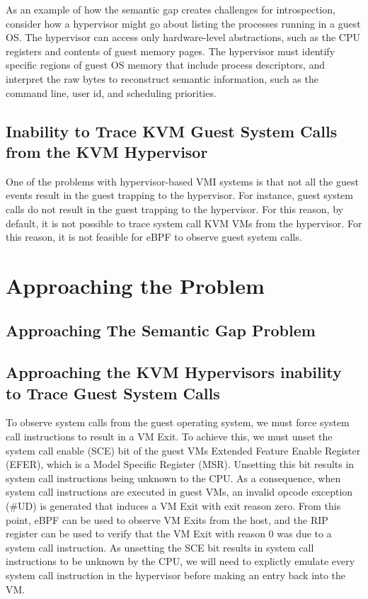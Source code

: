 \documentclass{report}
\begin{document}
\begin{spacing}{1.5}
{As an example of how the semantic gap creates challenges for introspection, consider how a hypervisor might
go about listing the processes running in a guest OS. The hypervisor can access only hardware-level abstractions, such
as the CPU registers and contents of guest memory pages. The hypervisor must identify specific regions of guest OS memory that include process descriptors, and interpret the raw bytes to reconstruct semantic information, such as the
command line, user id, and scheduling priorities.
\newline
}


\subsection{Inability to Trace KVM Guest System Calls from the KVM Hypervisor}

{\large
One of the problems with hypervisor-based VMI systems is that not all the guest events result in the guest trapping to the hypervisor. For instance, guest system calls do not result in the guest trapping to the hypervisor. For this reason, by default, it is not possible to trace system call KVM VMs from the hypervisor. For this reason, it is not feasible for eBPF to observe guest system calls.
\newline
}







\section{Approaching the Problem}


\subsection{Approaching The Semantic Gap Problem}



\subsection{Approaching the KVM Hypervisors inability to Trace Guest System Calls}

{\large
To observe system calls from the guest operating system, we must force system call instructions to result in a VM Exit. To achieve this, we must unset the system call enable (SCE) bit of the guest VMs Extended Feature Enable Register (EFER), which is a Model Specific Register (MSR). Unsetting this bit results in system call instructions being unknown to the CPU. As a consequence, when system call instructions are executed in guest VMs, an invalid opcode exception (\#UD) is generated that induces a VM Exit with exit reason zero. From this point, eBPF can be used to observe VM Exits from the host, and the RIP register can be used to verify that the VM Exit with reason 0 was due to a system call instruction. As unsetting the SCE bit results in system call instructions to be unknown by the CPU, we will need to explictly emulate every system call instruction in the hypervisor before making an entry back into the VM.
\newline
}


\end{spacing}
\end{document}
